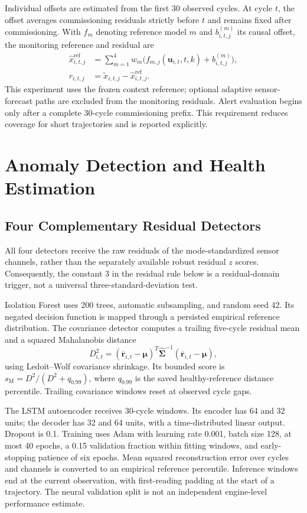 \documentclass[conference]{IEEEtran}
\begin{document}
Individual offsets are estimated from the first 30 observed cycles. At cycle $t$, the offset averages commissioning residuals strictly before $t$ and remains fixed after commissioning. With $f_m$ denoting reference model $m$ and $b^{(m)}_{i,t,j}$ its causal offset, the monitoring reference and residual are
\begin{align}
\widehat{x}^{\mathrm{ref}}_{i,t,j}
 &=\sum_{m=1}^{4}w_m\bigl(f_{m,j}(\mathbf{u}_{i,t},t,k)+b^{(m)}_{i,t,j}\bigr),\\
r_{i,t,j}&=\widetilde{x}_{i,t,j}-\widehat{x}^{\mathrm{ref}}_{i,t,j}.
\label{eq:residual}
\end{align}
This experiment uses the frozen context reference; optional adaptive sensor-forecast paths are excluded from the monitoring residuals. Alert evaluation begins only after a complete 30-cycle commissioning prefix. This requirement reduces coverage for short trajectories and is reported explicitly.

\section{Anomaly Detection and Health Estimation}
\subsection{Four Complementary Residual Detectors}
All four detectors receive the raw residuals of the mode-standardized sensor channels, rather than the separately available robust residual $z$ scores. Consequently, the constant 3 in the residual rule below is a residual-domain trigger, not a universal three-standard-deviation test.

Isolation Forest uses 200 trees, automatic subsampling, and random seed 42. Its negated decision function is mapped through a persisted empirical reference distribution. The covariance detector computes a trailing five-cycle residual mean and a squared Mahalanobis distance
\begin{equation}
D^2_{i,t}=(\overline{\mathbf{r}}_{i,t}-\boldsymbol{\mu})^{\!T}
\widehat{\boldsymbol{\Sigma}}^{-1}
(\overline{\mathbf{r}}_{i,t}-\boldsymbol{\mu}),
\end{equation}
using Ledoit--Wolf covariance shrinkage. Its bounded score is $s_{\mathrm{M}}=D^2/(D^2+q_{0.99})$, where $q_{0.99}$ is the saved healthy-reference distance percentile. Trailing covariance windows reset at observed cycle gaps.

The LSTM autoencoder receives 30-cycle windows. Its encoder has 64 and 32 units; the decoder has 32 and 64 units, with a time-distributed linear output. Dropout is 0.1. Training uses Adam with learning rate 0.001, batch size 128, at most 40 epochs, a 0.15 validation fraction within fitting windows, and early-stopping patience of six epochs. Mean squared reconstruction error over cycles and channels is converted to an empirical reference percentile. Inference windows end at the current observation, with first-reading padding at the start of a trajectory. The neural validation split is not an independent engine-level performance estimate.
\end{document}
